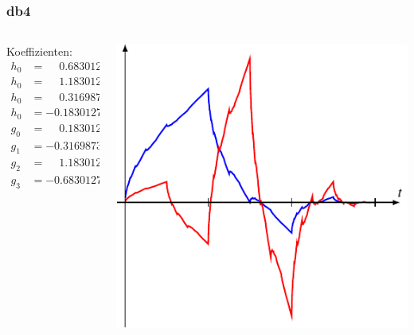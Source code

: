 \begin{frame}
\frametitle{db4}
\begin{columns}[T]
\begin{column}{2.5cm}
Koeffizienten:
\[
\begin{aligned}
h_0&=\phantom{-}0.6830127\\
h_0&=\phantom{-}1.1830127\\
h_0&=\phantom{-}0.3169873\\
h_0&=-0.1830127\\[10pt]
g_0&=\phantom{-}0.1830127\\
g_1&=-0.3169873\\
g_2&=\phantom{-}1.1830127\\
g_3&=-0.6830127
\end{aligned}
\]
\end{column}
\begin{column}{9.5cm}
\includegraphics{../../buch/chapters/7-algo/images/db2.pdf}
\end{column}
\end{columns}
\end{frame}


